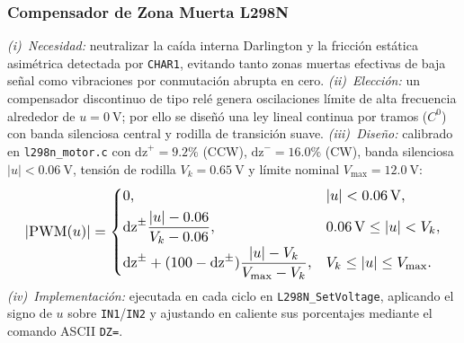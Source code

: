 \begin{enumerate}
\end{enumerate}

\subsubsection{Compensador de Zona Muerta L298N}
\textit{(i)~Necesidad:} neutralizar la caída interna Darlington y la fricción estática asimétrica detectada por \texttt{CHAR1}, evitando tanto zonas muertas efectivas de baja señal como vibraciones por conmutación abrupta en cero.
\textit{(ii)~Elección:} un compensador discontinuo de tipo relé genera oscilaciones límite de alta frecuencia alrededor de $u=\qty{0}{\volt}$; por ello se diseñó una ley lineal continua por tramos ($C^0$) con banda silenciosa central y rodilla de transición suave.
\textit{(iii)~Diseño:} calibrado en \texttt{l298n\_motor.c} con $\mathrm{dz}^+=9.2\%$ (CCW), $\mathrm{dz}^-=16.0\%$ (CW), banda silenciosa $|u|<\qty{0.06}{\volt}$, tensión de rodilla $V_k=\qty{0.65}{\volt}$ y límite nominal $V_{\max}=\qty{12.0}{\volt}$:
\begin{equation}
\resizebox{0.96\columnwidth}{!}{$\displaystyle
    |\mathrm{PWM}(u)| =
    \begin{cases}
        0, & |u| < \qty{0.06}{\volt}, \\[3pt]
        \mathrm{dz}^{\pm}\dfrac{|u| - 0.06}{V_k - 0.06}, & \qty{0.06}{\volt} \le |u| < V_k, \\[6pt]
        \mathrm{dz}^{\pm} + (100 - \mathrm{dz}^{\pm})\dfrac{|u| - V_k}{V_{\max} - V_k}, & V_k \le |u| \le V_{\max}.
    \end{cases}
$}
    \label{eq:comp_l298n}
\end{equation}
\textit{(iv)~Implementación:} ejecutada en cada ciclo en \texttt{L298N\_SetVoltage}, aplicando el signo de $u$ sobre \texttt{IN1}/\texttt{IN2} y ajustando en caliente sus porcentajes mediante el comando ASCII \texttt{DZ=}.

